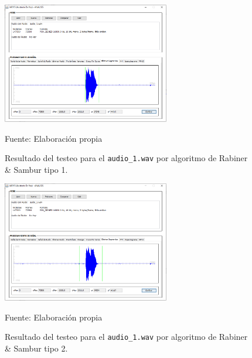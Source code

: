 \vskip -1cm

\begin{figure}[H]
\begin{center}
\includegraphics[width=0.65\textwidth]{Imagenes/Cap3/image072}
\end{center}
\begin{center}
\vskip -0.5cm
\caption{\small{Resultado del testeo para el \texttt{audio\_1.wav} por algoritmo de Rabiner \& Sambur tipo 1.}}
\label{fig:figura3.72}
{\small{Fuente: Elaboración propia}}
\end{center}
\end{figure}

\begin{figure}[H]
\begin{center}
\includegraphics[width=0.65\textwidth]{Imagenes/Cap3/image073}
\end{center}
\begin{center}
\vskip -0.5cm
\caption{\small{Resultado del testeo para el \texttt{audio\_1.wav} por algoritmo de Rabiner \& Sambur tipo 2.}}
\label{fig:figura3.73}
{\small{Fuente: Elaboración propia}}
\end{center}
\end{figure}

\vskip -1cm

